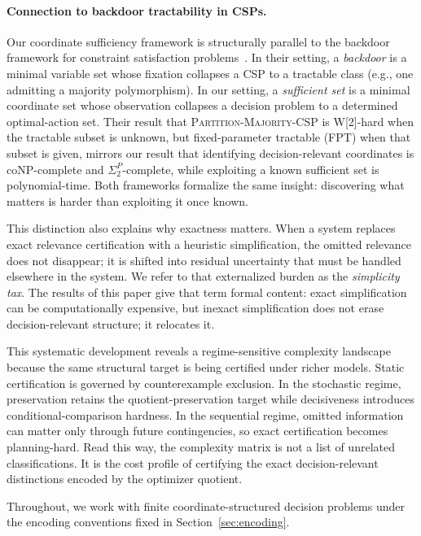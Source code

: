 \paragraph{Connection to backdoor tractability in CSPs.}
Our coordinate sufficiency framework is structurally parallel to the backdoor framework for constraint satisfaction problems~\cite{bessiere2013detecting}. In their setting, a \emph{backdoor} is a minimal variable set whose fixation collapses a CSP to a tractable class (e.g., one admitting a majority polymorphism). In our setting, a \emph{sufficient set} is a minimal coordinate set whose observation collapses a decision problem to a determined optimal-action set. Their result that \textsc{Partition-Majority-CSP} is W[2]-hard when the tractable subset is unknown, but fixed-parameter tractable (FPT) when that subset is given, mirrors our result that identifying decision-relevant coordinates is coNP-complete and $\Sigma_2^P$-complete, while exploiting a known sufficient set is polynomial-time. Both frameworks formalize the same insight: discovering what matters is harder than exploiting it once known.

This distinction also explains why exactness matters. When a system replaces exact relevance certification with a heuristic simplification, the omitted relevance does not disappear; it is shifted into residual uncertainty that must be handled elsewhere in the system. We refer to that externalized burden as the \emph{simplicity tax}. The results of this paper give that term formal content: exact simplification can be computationally expensive, but inexact simplification does not erase decision-relevant structure; it relocates it.

This systematic development reveals a regime-sensitive complexity landscape because the same structural target is being certified under richer models. Static certification is governed by counterexample exclusion. In the stochastic regime, preservation retains the quotient-preservation target while decisiveness introduces conditional-comparison hardness. In the sequential regime, omitted information can matter only through future contingencies, so exact certification becomes planning-hard. Read this way, the complexity matrix is not a list of unrelated classifications. It is the cost profile of certifying the exact decision-relevant distinctions encoded by the optimizer quotient.

Throughout, we work with finite coordinate-structured decision problems under the encoding conventions fixed in Section~\ref{sec:encoding}.

